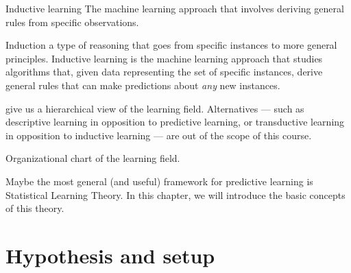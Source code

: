 \begin{defbox}{Inductive learning}{}
  The machine learning approach that involves deriving general rules from specific
  observations.
\end{defbox}

Induction a type of reasoning that goes from specific instances to more general
principles.  Inductive learning is the machine learning approach that studies algorithms
that, given data representing the set of specific instances, derive general rules that
can make predictions about \emph{any} new instances.

 give us a hierarchical view of the learning field.  Alternatives ---
such as descriptive learning in opposition to predictive learning, or transductive
learning in opposition to inductive learning --- are out of the scope of this course.

\begin{figurebox}[label=fig:learning]{Organizational chart of the learning field.}
  \centering
\end{figurebox}

Maybe the most general (and useful) framework for predictive learning is Statistical
Learning Theory.  In this chapter, we will introduce the basic concepts of this theory.

\section{Hypothesis and setup}

